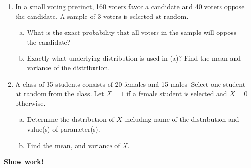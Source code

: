 \documentclass[12pt]{article}
\begin{document}
\begin{enumerate}
  \item In a small voting precinct, 160 voters favor a candidate and 40 voters oppose the candidate. A sample of 3 voters is selected at random.
    \begin{enumerate}[(a)]
      \item What is the exact probability that all voters in the sample will oppose the candidate?
      \item Exactly what underlying distribution is used in (a)? Find the mean and variance of the distribution.
    \end{enumerate}

  \item A class of 35 students consists of 20 females and 15 males. Select one student at random from the class. Let $X = 1$ if a female student is selected and $X = 0$ otherwise.
    \begin{enumerate}[(a)]
      \item Determine the distribution of $X$ including name of the distribution and value(s) of parameter(s).
      \item Find the mean, and variance of $X$.
    \end{enumerate}
\end{enumerate}

\begin{center}
  \textbf{\large Show work!}
\end{center}
\end{document}
